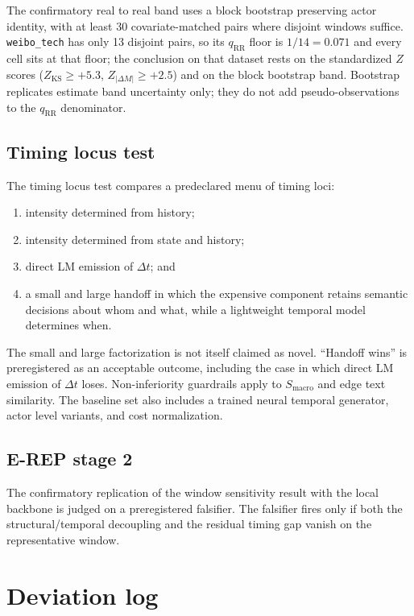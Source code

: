 The confirmatory real to real band uses a block bootstrap preserving actor
identity, with at least 30 covariate-matched pairs where disjoint windows
suffice. \texttt{weibo\_tech} has only 13 disjoint pairs, so its $q_{\mathrm{RR}}$
floor is $1/14 = 0.071$ and every cell sits at that floor; the conclusion on
that dataset rests on the standardized $Z$ scores ($Z_{\mathrm{KS}} \ge +5.3$,
$Z_{|\Delta M|} \ge +2.5$) and on the block bootstrap band. Bootstrap replicates
estimate band uncertainty only; they do not add pseudo-observations to the
$q_{\mathrm{RR}}$ denominator.

\subsection{Timing locus test}

The timing locus test compares a predeclared menu of timing loci:
\begin{enumerate}
    \item intensity determined from history;
    \item intensity determined from state and history;
    \item direct LM emission of $\Delta t$; and
    \item a small and large handoff in which the expensive component retains
    semantic decisions about whom and what, while a lightweight temporal model
    determines when.
\end{enumerate}

The small and large factorization is not itself claimed as novel. ``Handoff wins''
is preregistered as an acceptable outcome, including the case in which direct
LM emission of $\Delta t$ loses. Non-inferiority guardrails apply to
$S_{\mathrm{macro}}$ and edge text similarity. The baseline set also includes
a trained neural temporal generator, actor level variants, and cost
normalization.

\subsection{E-REP stage 2}

The confirmatory replication of the window sensitivity result with the local
backbone is judged on a preregistered falsifier. The falsifier fires only if
both the structural/temporal decoupling and the residual timing gap vanish on
the representative window.


\section{Deviation log}
\label{app:deviations}

